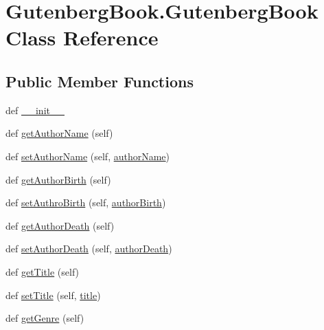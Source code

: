 \hypertarget{class_gutenberg_book_1_1_gutenberg_book}{}\section{Gutenberg\+Book.\+Gutenberg\+Book Class Reference}
\label{class_gutenberg_book_1_1_gutenberg_book}
\subsection*{Public Member Functions}
\begin{DoxyCompactItemize}
\item 
def \hyperlink{class_gutenberg_book_1_1_gutenberg_book_ab54eccb3d7735821ded27353cc967139}{\+\_\+\+\_\+init\+\_\+\+\_\+}
\item 
def \hyperlink{class_gutenberg_book_1_1_gutenberg_book_af373b71a5b05dab220647c2d32ff4bce}{get\+Author\+Name} (self)
\item 
def \hyperlink{class_gutenberg_book_1_1_gutenberg_book_a08b7d5550df691a9dbd2b8341df1c199}{set\+Author\+Name} (self, \hyperlink{class_gutenberg_book_1_1_gutenberg_book_aa791b333bc15083ffcd70e31565c3ce0}{author\+Name})
\item 
def \hyperlink{class_gutenberg_book_1_1_gutenberg_book_a8f2e41009352ef78ffa96aa693ea0a27}{get\+Author\+Birth} (self)
\item 
def \hyperlink{class_gutenberg_book_1_1_gutenberg_book_ac379f43783f7f3db54a44635cbe0a465}{set\+Authro\+Birth} (self, \hyperlink{class_gutenberg_book_1_1_gutenberg_book_aa470512f70b49c44577cda4167a2abe4}{author\+Birth})
\item 
def \hyperlink{class_gutenberg_book_1_1_gutenberg_book_a65d075fb4340f1b942416134bc3ae426}{get\+Author\+Death} (self)
\item 
def \hyperlink{class_gutenberg_book_1_1_gutenberg_book_a8872fe6b29888ad3122748a0a87f4b66}{set\+Author\+Death} (self, \hyperlink{class_gutenberg_book_1_1_gutenberg_book_a271f557aa0ed0b5a1430b7250e5c6da9}{author\+Death})
\item 
def \hyperlink{class_gutenberg_book_1_1_gutenberg_book_ae12a0d74064224aa20921cff74cf1f02}{get\+Title} (self)
\item 
def \hyperlink{class_gutenberg_book_1_1_gutenberg_book_a41daad48dbcf32d8ed7918092295c7f0}{set\+Title} (self, \hyperlink{class_gutenberg_book_1_1_gutenberg_book_adbf667fb4a34b8937c3c4e755f62b3dd}{title})
\item 
def \hyperlink{class_gutenberg_book_1_1_gutenberg_book_ab0456baf3ba5650c8ca5d1340c0aa53b}{get\+Genre} (self)

\end{DoxyCompactItemize}
